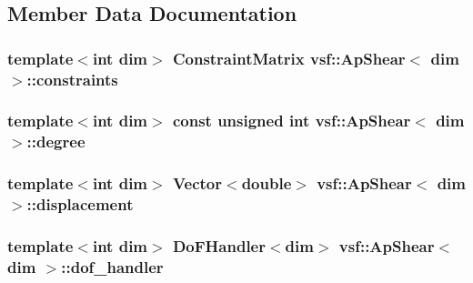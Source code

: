 \subsection{Member Data Documentation}
\hypertarget{classvsf_1_1ApShear_afcd25b4c0be9a4c7e69165e6eb151240}{
\subsubsection[{constraints}]{\setlength{\rightskip}{0pt plus 5cm}template$<$int dim$>$ Constraint\-Matrix {\bf vsf\-::\-Ap\-Shear}$<$ dim $>$\-::constraints\hspace{0.3cm}{\ttfamily [private]}}}\label{classvsf_1_1ApShear_afcd25b4c0be9a4c7e69165e6eb151240}
\hypertarget{classvsf_1_1ApShear_ae4927f95e4a98c107d743a078a9b1bc8}{
\subsubsection[{degree}]{\setlength{\rightskip}{0pt plus 5cm}template$<$int dim$>$ const unsigned int {\bf vsf\-::\-Ap\-Shear}$<$ dim $>$\-::degree\hspace{0.3cm}{\ttfamily [private]}}}\label{classvsf_1_1ApShear_ae4927f95e4a98c107d743a078a9b1bc8}
\hypertarget{classvsf_1_1ApShear_a24a3ff890f533f1ccc640371c6230d78}{
\subsubsection[{displacement}]{\setlength{\rightskip}{0pt plus 5cm}template$<$int dim$>$ Vector$<$double$>$ {\bf vsf\-::\-Ap\-Shear}$<$ dim $>$\-::displacement\hspace{0.3cm}{\ttfamily [private]}}}\label{classvsf_1_1ApShear_a24a3ff890f533f1ccc640371c6230d78}
\hypertarget{classvsf_1_1ApShear_a55da0ced5f7ee7c16a518073f4524ffb}{
\subsubsection[{dof\-\_\-handler}]{\setlength{\rightskip}{0pt plus 5cm}template$<$int dim$>$ Do\-F\-Handler$<$dim$>$ {\bf vsf\-::\-Ap\-Shear}$<$ dim $>$\-::dof\-\_\-handler\hspace{0.3cm}{\ttfamily [private]}}}\label{classvsf_1_1ApShear_a55da0ced5f7ee7c16a518073f4524ffb}
